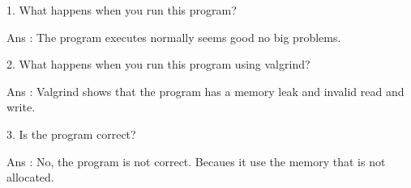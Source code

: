 \documentclass[10pt, answers]{exam}
\begin{document}
\begin{questions}
\begin{solution}
        1. What happens when you run this program?
        
        Ans : The program executes normally seems good no big problems.

        2. What happens when you run this program using valgrind?

        Ans : Valgrind shows that the program has a memory leak and
        invalid read and write.

        3. Is the program correct?

        Ans : No, the program is not correct. Becaues 
        it use the memory that is not allocated.
        \end{solution}
        
        
        
        \end{questions}
\end{document}
